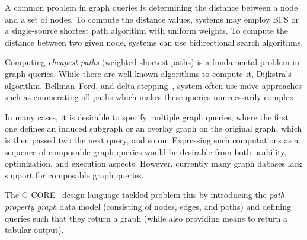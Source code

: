 



A common problem in graph queries is determining the distance between a node and a set of nodes. To compute the distance values, systems may employ BFS or a single-source shortest path algorithm with uniform weights.
To compute the distance between two given node, systems can use bidirectional search algorithms.





Computing \emph{cheapest paths} (weighted shortest paths) is a fundamental problem in graph queries.
While there are well-known algorithms to compute it, \eg Dijkstra's algorithm, Bellman--Ford, and delta-stepping~\cite{DBLP:journals/jal/MeyerS03}, system often use na\"ive approaches such as enumerating all paths which makes these queries unnecessarily complex.





In many cases, it is desirable to specify multiple graph queries, where the first one defines an induced subgraph or an overlay graph on the original graph, which is then passed two the next query, and so on.
Expressing such computations as a sequence of composable graph queries would be desirable from both usability, optimization, and execution aspects. However, currently many graph dabases lack support for composable graph queries.

The \mbox{G-CORE}~\cite{DBLP:conf/sigmod/AnglesABBFGLPPS18} design language tackled problem this by introducing the \emph{path property graph} data model (consisting of nodes, edges, and paths) and defining queries such that they return a graph (while also providing means to return a tabular output).




